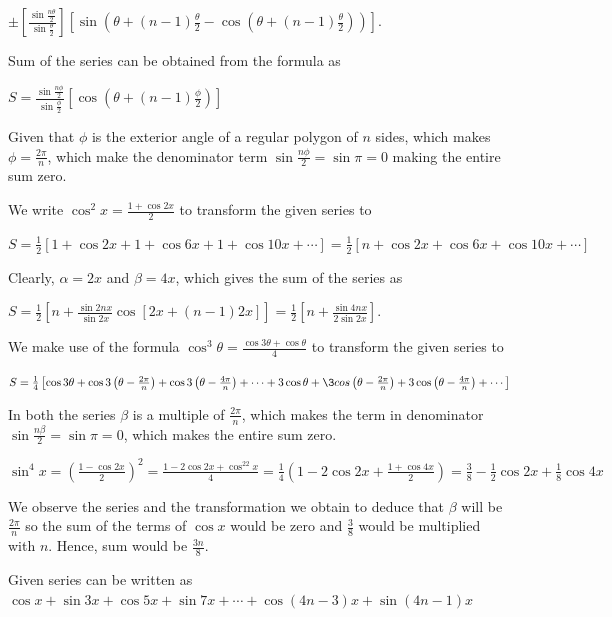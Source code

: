   $\pm\left[\frac{\sin\frac{n\theta}{2}}{\sin\frac{\theta}{2}}\right]\left[\sin\left(\theta + (n -
    1)\frac{\theta}{2} - \cos\left(\theta + (n - 1)\frac{\theta}{2}\right)\right)\right]$.
\item Sum of the series can be obtained from the formula as

  $S = \frac{\sin\frac{n\phi}{2}}{\sin\frac{\phi}{2}}\left[\cos\left(\theta + (n -
  1)\frac{\phi}{2}\right)\right]$

  Given that $\phi$ is the exterior angle of a regular polygon of $n$ sides, which makes $\phi =
  \frac{2\pi}{n}$, which make the denominator term $\sin\frac{n\phi}{2} = \sin\pi = 0$ making the entire sum
  zero.
\item We write $\cos^2x = \frac{1 + \cos2x}{2}$ to transform the given series to

  $S = \frac{1}{2}[1 + \cos2x + 1 + \cos6x + 1 + \cos10x + \cdots] = \frac{1}{2}[n + \cos2x + \cos6x +
  \cos10x + \cdots]$

  Clearly, $\alpha = 2x$ and $\beta = 4x$, which gives the sum of the series as

  $S = \frac{1}{2}\left[n + \frac{\sin 2nx}{\sin 2x}\cos[2x + (n - 1)2x]\right] = \frac{1}{2}\left[n +
    \frac{\sin4nx}{2\sin2x}\right]$.
\item We make use of the formula $\cos^3\theta = \frac{\cos3\theta + \cos\theta}{4}$ to transform the given
  series to

  $S = \frac{1}{4}\left[\cos3\theta + \cos3\left(\theta - \frac{2\pi}{n}\right) + \cos3\left(\theta -
    \frac{4\pi}{n}\right) + \cdots + 3\cos\theta + \3cos\left(\theta - \frac{2\pi}{n}\right) +
    3\cos\left(\theta - \frac{4\pi}{n}\right) + \cdots\right]$

  In both the series $\beta$ is a multiple of $\frac{2\pi}{n}$, which makes the term in denominator
  $\sin\frac{n\beta}{2} = \sin\pi = 0$, which makes the entire sum zero.
\item $\sin^4x = \left(\frac{1 - \cos2x}{2}\right)^2 = \frac{1 - 2\cos2x + \cos^22x}{4} = \frac{1}{4}\left(1
  - 2\cos2x + \frac{1 + \cos4x}{2}\right) = \frac{3}{8} - \frac{1}{2}\cos2x + \frac{1}{8}\cos4x$

  We observe the series and the transformation we obtain to deduce that $\beta$ will be $\frac{2\pi}{n}$ so
  the sum of the terms of $\cos x$ would be zero and $\frac{3}{8}$ would be multiplied with $n$. Hence, sum
  would be $\frac{3n}{8}$.
\item Given series can be written as $\cos x + \sin3x + \cos5x + \sin7x + \cdots + \cos(4n - 3)x + \sin(4n -
  1)x$

